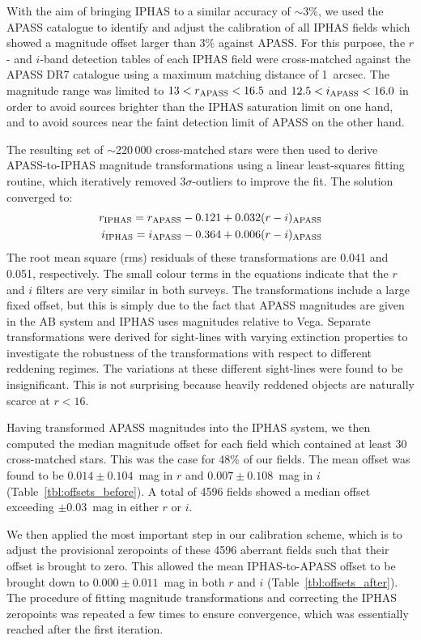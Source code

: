 \documentclass[useAMS,usenatbib]{mn2e}
\begin{document}
With the aim of bringing IPHAS to a similar accuracy of $\sim$3\%,
we used the APASS catalogue to identify and adjust the calibration of all IPHAS fields 
which showed a magnitude offset larger than 3\% against APASS.
For this purpose,
the $r$- and $i$-band detection tables of each IPHAS field
were cross-matched against the APASS DR7 catalogue 
using a maximum matching distance of 1~arcsec.
The magnitude range was limited to
$13<r_{\rm APASS}<16.5$ and $12.5<i_{\rm APASS}<16.0$
in order to avoid sources 
brighter than the IPHAS saturation limit on one hand, 
and to avoid sources near the faint detection limit of APASS 
on the other hand.

The resulting set of $\sim$220\,000 cross-matched stars were then used 
to derive APASS-to-IPHAS magnitude transformations
using a linear least-squares fitting routine, 
which iteratively removed $3\sigma$-outliers to improve the fit.
The solution converged to:
\begin{align} 
r_{\rm IPHAS} = r_{\rm APASS} - 0.121 + 0.032(r-i)_{\rm APASS} \label{eqn:apass_r} \\
i_{\rm IPHAS} = i_{\rm APASS} - 0.364 + 0.006(r-i)_{\rm APASS} \label{eqn:apass_i}
\end{align}
The root mean square (rms) residuals of these transformations 
are 0.041 and 0.051, respectively.
The small colour terms in the equations
indicate that the $r$ and $i$ filters 
are very similar in both surveys.
The transformations include a large fixed offset,
but this is simply due to the fact that 
APASS magnitudes are given in the AB system
and IPHAS uses magnitudes relative to Vega.
Separate transformations were derived for sight-lines 
with varying extinction properties to investigate the robustness
of the transformations with respect to different reddening regimes.
The variations at these different
sight-lines were found to be insignificant.
This is not surprising because heavily reddened objects 
are naturally scarce at $r<16$.

Having transformed APASS magnitudes into the IPHAS system,
we then computed the median magnitude offset 
for each field which contained at least 30 cross-matched stars.
This was the case for 48\% of our fields.
The mean offset was found to be
$0.014\pm0.104$~mag in $r$ and $0.007\pm0.108$~mag in $i$
(Table~\ref{tbl:offsets_before}).
A total of 4596 fields showed a median offset
exceeding $\pm$0.03~mag in either $r$ or $i$.

We then applied the most important step in our calibration scheme,
which is to adjust the provisional zeropoints of these 4596 aberrant fields
such that their offset is brought to zero.
This allowed the mean IPHAS-to-APASS offset 
to be brought down to $0.000\pm0.011$~mag in both $r$ and $i$
(Table~\ref{tbl:offsets_after}).
The procedure of fitting magnitude transformations and
correcting the IPHAS zeropoints was repeated a few times to ensure 
convergence, which was essentially reached after the first iteration.
\end{document}
